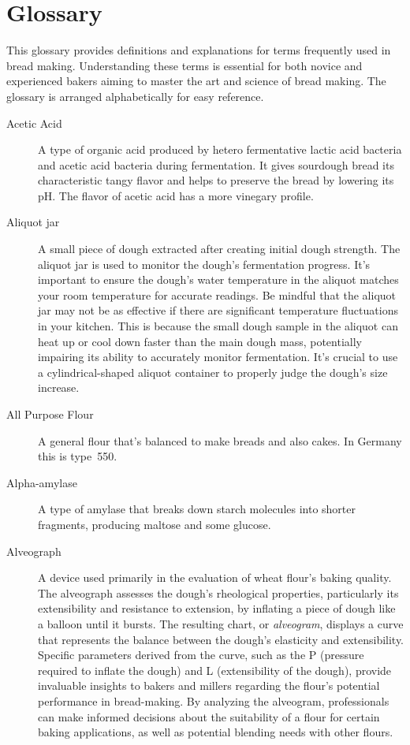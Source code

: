\chapter{Glossary}%
\label{ch:Glossary}

\begin{quoting}
This glossary provides definitions and explanations for terms frequently
used in bread making. Understanding these terms is essential for both
novice and experienced bakers aiming to master the art and science of
bread making. The glossary is arranged alphabetically for easy reference.
\end{quoting}

\begin{description}

\item[Acetic Acid] A type of organic acid produced by hetero fermentative lactic
acid bacteria and acetic acid bacteria during fermentation. It gives sourdough bread
its characteristic tangy flavor and helps to preserve the bread by lowering its pH.
The flavor of acetic acid has a more vinegary profile.

\item[Aliquot jar] A small piece of dough extracted after creating initial
dough strength.  The aliquot jar is used to monitor the dough's fermentation progress.
It's important to ensure the dough's water temperature in the aliquot matches
your room temperature for accurate readings. Be mindful that the aliquot
jar may not be as effective if there are significant temperature
fluctuations in your kitchen. This is because the small dough sample in
the aliquot can heat up or cool down faster than the main dough mass,
potentially impairing its ability to accurately monitor fermentation.
It's crucial to use a cylindrical-shaped aliquot container to properly judge
the dough's size increase.

\item[All Purpose Flour] A general flour that’s balanced to make breads and also
cakes. In Germany this is type~550.

\item[Alpha-amylase] A type of amylase that breaks down starch molecules into
shorter fragments, producing maltose and some glucose.

\item[Alveograph] A device used primarily in the evaluation of wheat flour's
baking quality. The alveograph assesses the dough's rheological properties,
particularly its extensibility and resistance to extension, by inflating a piece
of dough like a balloon until it bursts. The resulting chart, or \emph{alveogram},
displays a curve that represents the balance between the dough's elasticity and
extensibility. Specific parameters derived from the curve, such as the P (pressure
required to inflate the dough) and L (extensibility of the dough), provide invaluable
insights to bakers and millers regarding the flour's potential performance in
bread-making. By analyzing the alveogram, professionals can make informed decisions
about the suitability of a flour for certain baking applications, as well as
potential blending needs with other flours.


\end{description}
